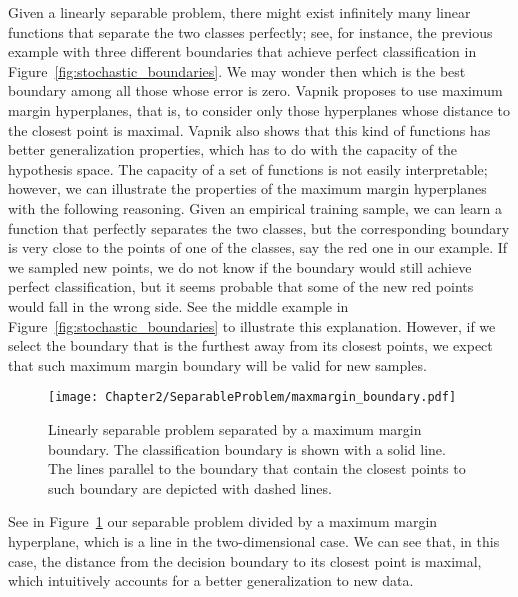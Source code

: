 Given a linearly separable problem, there might exist infinitely many linear functions that separate the two classes perfectly; see, for instance, the previous example with three different boundaries that achieve perfect classification in Figure~\ref{fig:stochastic_boundaries}.
We may wonder then which is the best boundary among all those whose error is zero. Vapnik proposes to use maximum margin hyperplanes, that is, to consider only those hyperplanes whose distance to the closest point is maximal.
Vapnik also shows that this kind of functions has better generalization properties, which has to do with the capacity of the hypothesis space.
%
The capacity of a set of functions is not easily interpretable; however, we can illustrate the properties of the maximum margin hyperplanes with the following reasoning. Given an empirical training sample, we can learn a function that perfectly separates the two classes, but the corresponding boundary is very close to the points of one of the classes, say the red one in our example. If we sampled new points, we do not know if the boundary would still achieve perfect classification, but it seems probable that some of the new red points would fall in the wrong side. See the middle example in Figure~\ref{fig:stochastic_boundaries} to illustrate this explanation.
%
However, if we select the boundary that is the furthest away from its closest points, we expect that such maximum margin boundary will be valid for new samples.
%
\begin{figure}[t!]
    \centering
    \texttt{[image: Chapter2/SeparableProblem/maxmargin\_boundary.pdf]}
    \caption{Linearly separable problem separated by a maximum margin boundary. The classification boundary is shown with a solid line. The lines parallel to the boundary that contain the closest points to such boundary are depicted with dashed lines.}
    \label{fig:maxmargin_boundary}
\end{figure}
%
See in Figure~\ref{fig:maxmargin_boundary} our separable problem divided by a maximum margin hyperplane, which is a line in the two-dimensional case. We can see that, in this case, the distance from the decision boundary to its closest point is maximal, which intuitively accounts for a better generalization to new data.

